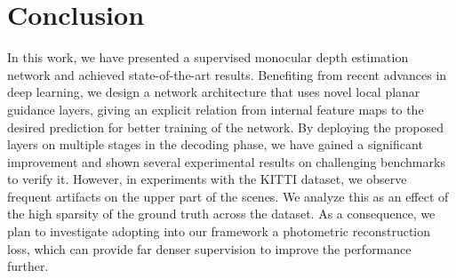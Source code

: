 \documentclass[10pt,twocolumn,letterpaper]{article}
\begin{document}
\section{Conclusion}
\label{sec:conclusion}
In this work, we have presented a supervised monocular depth estimation network and achieved state-of-the-art results.
Benefiting from recent advances in deep learning, we design a network architecture that uses novel local planar guidance layers, giving an explicit relation from internal feature maps to the desired prediction for better training of the network.
By deploying the proposed layers on multiple stages in the decoding phase, we have gained a significant improvement and shown several experimental results on challenging benchmarks to verify it.
However, in experiments with the KITTI dataset, we observe frequent artifacts on the upper part of the scenes.
We analyze this as an effect of the high sparsity of the ground truth across the dataset.
As a consequence, we plan to investigate adopting into our framework a photometric reconstruction loss, which can provide far denser supervision to improve the performance further.


{\small
	
	
}
\end{document}
